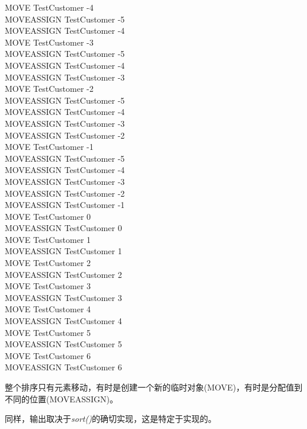 \begin{myOutput}
MOVE TestCustomer -4 \\
MOVEASSIGN TestCustomer -5 \\
MOVEASSIGN TestCustomer -4 \\
MOVE TestCustomer -3 \\
MOVEASSIGN TestCustomer -5 \\
MOVEASSIGN TestCustomer -4 \\
MOVEASSIGN TestCustomer -3 \\
MOVE TestCustomer -2 \\
MOVEASSIGN TestCustomer -5 \\
MOVEASSIGN TestCustomer -4 \\
MOVEASSIGN TestCustomer -3 \\
MOVEASSIGN TestCustomer -2 \\
MOVE TestCustomer -1 \\
MOVEASSIGN TestCustomer -5 \\
MOVEASSIGN TestCustomer -4 \\
MOVEASSIGN TestCustomer -3 \\
MOVEASSIGN TestCustomer -2 \\
MOVEASSIGN TestCustomer -1 \\
MOVE TestCustomer 0 \\
MOVEASSIGN TestCustomer 0 \\
MOVE TestCustomer 1 \\
MOVEASSIGN TestCustomer 1 \\
MOVE TestCustomer 2 \\
MOVEASSIGN TestCustomer 2 \\
MOVE TestCustomer 3 \\
MOVEASSIGN TestCustomer 3 \\
MOVE TestCustomer 4 \\
MOVEASSIGN TestCustomer 4 \\
MOVE TestCustomer 5 \\
MOVEASSIGN TestCustomer 5 \\
MOVE TestCustomer 6 \\
MOVEASSIGN TestCustomer 6 \\
\end{myOutput}

整个排序只有元素移动，有时是创建一个新的临时对象(MOVE)，有时是分配值到不同的位置(MOVEASSIGN)。\par

同样，输出取决于\textit{sort()}的确切实现，这是特定于实现的。\par

